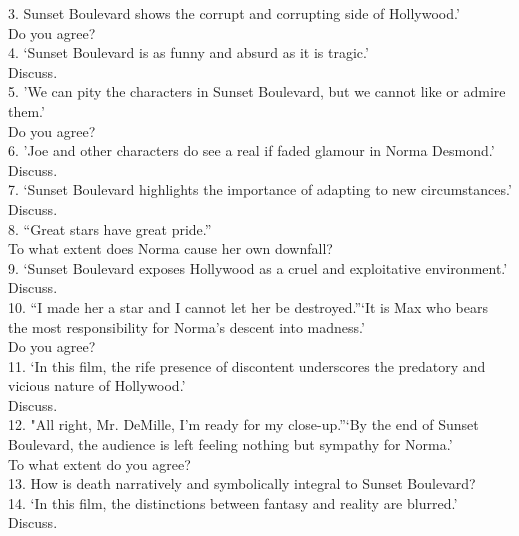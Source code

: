 \documentclass[a4paper]{article}
\begin{document}
3. Sunset Boulevard shows the corrupt and corrupting side of Hollywood.’\\ Do you agree?\\

4. ‘Sunset Boulevard is as funny and absurd as it is tragic.’\\ Discuss.\\

5. 'We can pity the characters in Sunset Boulevard, but we cannot like or admire them.'\\ Do you agree?\\

6. 'Joe and other characters do see a real if faded glamour in Norma Desmond.'\\ Discuss.\\

7. ‘Sunset Boulevard highlights the importance of adapting to new circumstances.’\\ Discuss.\\

8. “Great stars have great pride.”\\ To what extent does Norma cause her own downfall?\\

9. ‘Sunset Boulevard exposes Hollywood as a cruel and exploitative environment.’\\ Discuss.\\

10. “I made her a star and I cannot let her be destroyed.”‘It is Max who bears the most responsibility for Norma’s descent into madness.’\\ Do you agree?\\

11. ‘In this film, the rife presence of discontent underscores the predatory and vicious nature of Hollywood.’\\ Discuss.\\

12. "All right, Mr. DeMille, I'm ready for my close-up.”‘By the end of Sunset Boulevard, the audience is left feeling nothing but sympathy for Norma.’\\ To what extent do you agree?\\

13. How is death narratively and symbolically integral to Sunset Boulevard?\\

14. ‘In this film, the distinctions between fantasy and reality are blurred.’\\ Discuss.\\
\end{document}
